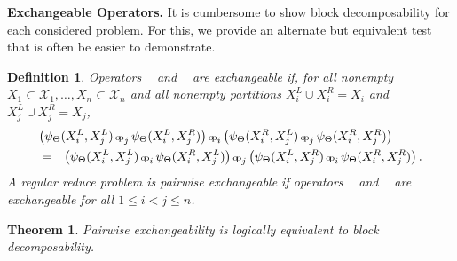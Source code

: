 \documentclass{article}
\newtheorem{theorem}{Theorem}
\newtheorem{definition} {Definition}
\newcommand{\opsym}{{\scriptstyle \mathrm{o\!p}}}
\newcommand{\opcurry}[3][]{\mathop{\opsym^{#1}_{#2}{#3}}}
\newcommand{\op}[2][]{\opcurry[#1]{#2}{}}
\newcommand{\GNP}{\psi_{\Theta}}
\begin{document}
{\bf Exchangeable Operators.}  It is cumbersome to show block
decomposability for each considered problem.  For this, we provide an
alternate but equivalent test that is often be easier to demonstrate.
\begin{definition}
  Operators $\op{i}$ and $\op{j}$ are {\em exchangeable} if, for all
  nonempty $X_1 \subset \mathcal{X}_1,\ldots,X_n \subset
  \mathcal{X}_n$ and all nonempty partitions $X^L_i \cup X^R_i = X_i$
  and $X^L_j \cup X^R_j = X_j$,
  \begin{eqnarray*}
    \lefteqn{\left( \GNP(X^L_i,X^L_j) \op{j} \GNP(X^L_i,X^R_j) \right) \op{i} \left( \GNP(X^R_i,X^L_j) \op{j} \GNP(X^R_i,X^R_j) \right)} \\
    & = & \left( \GNP(X^L_i,X^L_j) \op{i} \GNP(X^R_i,X^L_j) \right) \op{j} \left( \GNP(X^L_i,X^R_j) \op{i} \GNP(X^R_i,X^R_j) \right) .
  \end{eqnarray*}
  A regular reduce problem is {\em pairwise exchangeable} if operators
  $\op{i}$ and $\op{j}$ are exchangeable for all $1 \leq i < j \leq
  n$.
\end{definition}
\begin{theorem}
  Pairwise exchangeability is logically equivalent to block
  decomposability.
\end{theorem}
\end{document}
